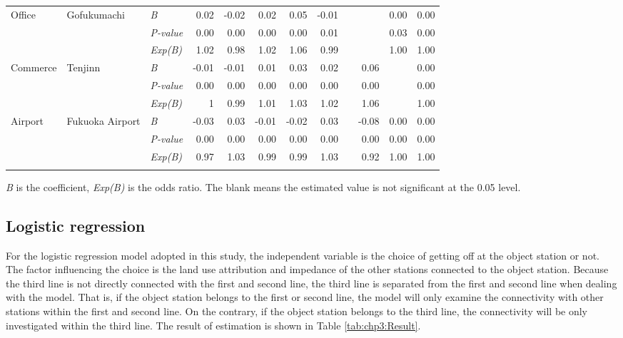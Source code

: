 \begin{sidewaystable}[htbp]
\begin{tabular}{p{7em}p{5em}p{5em}<{\centering}rrrrrrrrr}
		\multirow{3}[0]{7em}{Office} & \multirow{3}[0]{5em}{Gofukumachi} & \textsl{B} & 0.02 & -0.02 & 0.02 & 0.05 & -0.01 & & & 0.00 & 0.00 \\
		& & \textsl{P-value} & 0.00 & 0.00 & 0.00 & 0.00 & 0.01 & & & 0.03 & 0.00 \\
		& & \textsl{Exp(B)} & 1.02 & 0.98 & 1.02 & 1.06 & 0.99 & & & 1.00 & 1.00 \\
		\midrule
		
		\multirow{3}[0]{7em}{Commerce} & \multirow{3}[0]{5em}{Tenjinn} & \textsl{B} & -0.01 & -0.01 & 0.01  & 0.03  & 0.02  & & 0.06 & & 0.00 \\
		& & \textsl{P-value} & 0.00 & 0.00 & 0.00 & 0.00  & 0.00 & & 0.00 & & 0.00 \\
		& & \textsl{Exp(B)} & 1 & 0.99 & 1.01 & 1.03 & 1.02 & & 1.06 & & 1.00 \\
		\midrule
		
		\multirow{3}[0]{7em}{Airport} & \multirow{3}[0]{5em}{Fukuoka Airport} & \textsl{B} & -0.03 & 0.03 & -0.01 & -0.02 & 0.03 & & -0.08 & 0.00 & 0.00 \\
		& & \textsl{P-value} & 0.00 & 0.00 & 0.00 & 0.00 & 0.00 & & 0.00 & 0.00 & 0.00 \\
		& & \textsl{Exp(B)} & 0.97 & 1.03 & 0.99 & 0.99 & 1.03 & & 0.92 & 1.00 & 1.00 \\
		\Xhline{1.5pt}
		
	\end{tabular}%
	\begin{description}
		\label{note:tab:chp3:Result}
		\item[Note:] \textsl{B} is the coefficient, \textsl{Exp(B)} is the odds ratio. The blank means the estimated value is not significant at the 0.05 level.
	\end{description}
	
\end{sidewaystable}%

\subsection{Logistic regression}
%
For the logistic regression model adopted in this study, the independent variable is the choice of getting off at the object station or not. The factor influencing the choice is the land use attribution and impedance of the other stations connected to the object station. Because the third line is not directly connected with the first and second line, the third line is separated from the first and second line when dealing with the model. That is, if the object station belongs to the first or second line, the model will only examine the connectivity with other stations within the first and second line. On the contrary, if the object station belongs to the third line, the connectivity will be only investigated within the third line. The result of estimation is shown in Table \ref{tab:chp3:Result}.

